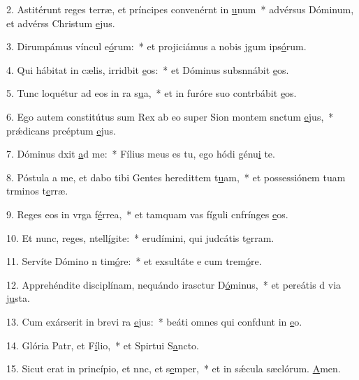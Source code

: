 2. Astitérunt reges terræ, et príncipes convenérnt in \uline{u}num~* advérsus Dóminum, et advérss Christum \uline{e}jus.\par 
3. Dirumpámus víncul e\uline{ó}rum:~* et projiciámus a nobis jgum ips\uline{ó}rum.\par 
4. Qui hábitat in cælis, irridbit \uline{e}os:~* et Dóminus subsnnábit \uline{e}os.\par 
5. Tunc loquétur ad eos in ra s\uline{u}a,~* et in furóre suo contrbábit \uline{e}os.\par 
6. Ego autem constitútus sum Rex ab eo super Sion montem snctum \uline{e}jus,~* prǽdicans prcéptum \uline{e}jus.\par 
7. Dóminus dxit \uline{a}d me:~* Fílius meus es tu, ego hódi génu\uline{i} te.\par 
8. Póstula a me, et dabo tibi Gentes heredittem t\uline{u}am,~* et possessiónem tuam trminos t\uline{e}rræ.\par 
9. Reges eos in vrga f\uline{é}rrea,~* et tamquam vas fíguli cnfrínges \uline{e}os.\par 
10. Et nunc, reges, ntell\uline{í}gite:~* erudímini, qui judcátis t\uline{e}rram.\par 
11. Servíte Dómino n tim\uline{ó}re:~* et exsultáte e cum trem\uline{ó}re.\par 
12. Apprehéndite disciplínam, nequándo irasctur D\uline{ó}minus,~* et pereátis d via j\uline{u}sta.\par 
13. Cum exárserit in brevi ra \uline{e}jus:~* beáti omnes qui confdunt in \uline{e}o.\par 
14. Glória Patr, et F\uline{í}lio,~* et Spirtui S\uline{a}ncto.\par 
15. Sicut erat in princípio, et nnc, et s\uline{e}mper,~* et in sǽcula sæclórum. \uline{A}men.\par 

